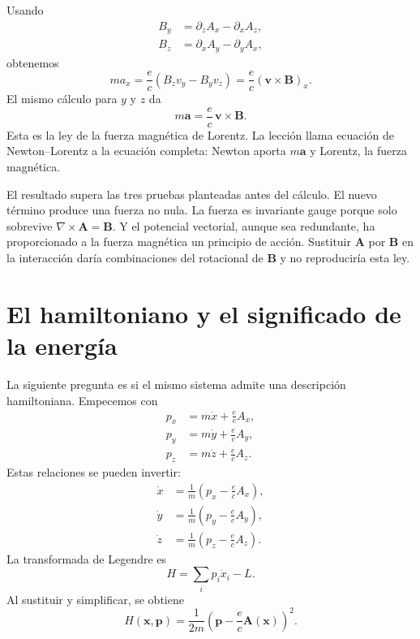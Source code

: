 Usando
\begin{align}
  B_y&=\partial_zA_x-\partial_xA_z,\\
  B_z&=\partial_xA_y-\partial_yA_x,
\end{align}
obtenemos
\begin{equation}
  m a_x
  =
  \frac{e}{c}
  \left(B_zv_y-B_yv_z\right)
  =
  \frac{e}{c}
  (\mathbf v\times\mathbf B)_x.
\end{equation}
El mismo cálculo para \(y\) y \(z\) da
\begin{equation}
  \boxed{
  m\mathbf a=\frac{e}{c}\,\mathbf v\times\mathbf B
  }.
\end{equation}
Esta es la ley de la fuerza magnética de Lorentz. La lección llama ecuación de Newton--Lorentz a la ecuación completa: Newton aporta \(m\mathbf a\) y Lorentz, la fuerza magnética.

El resultado supera las tres pruebas planteadas antes del cálculo. El nuevo término produce una fuerza no nula. La fuerza es invariante gauge porque solo sobrevive \(\nabla\times\mathbf A=\mathbf B\). Y el potencial vectorial, aunque sea redundante, ha proporcionado a la fuerza magnética un principio de acción. Sustituir \(\mathbf A\) por \(\mathbf B\) en la interacción daría combinaciones del rotacional de \(\mathbf B\) y no reproduciría esta ley.

\section{El hamiltoniano y el significado de la energía}

La siguiente pregunta es si el mismo sistema admite una descripción hamiltoniana. Empecemos con
\begin{align}
  p_x&=m\dot x+\frac{e}{c}A_x,\\
  p_y&=m\dot y+\frac{e}{c}A_y,\\
  p_z&=m\dot z+\frac{e}{c}A_z.
\end{align}
Estas relaciones se pueden invertir:
\begin{align}
  \dot x&=\frac{1}{m}\left(p_x-\frac{e}{c}A_x\right),\\
  \dot y&=\frac{1}{m}\left(p_y-\frac{e}{c}A_y\right),\\
  \dot z&=\frac{1}{m}\left(p_z-\frac{e}{c}A_z\right).
\end{align}
La transformada de Legendre es
\begin{equation}
  H=\sum_i p_i\dot x_i-L.
\end{equation}
Al sustituir y simplificar, se obtiene
\begin{equation}
  \boxed{
  H(\mathbf x,\mathbf p)
  =
  \frac{1}{2m}
  \left(
    \mathbf p-\frac{e}{c}\mathbf A(\mathbf x)
  \right)^2
  }.
\end{equation}


